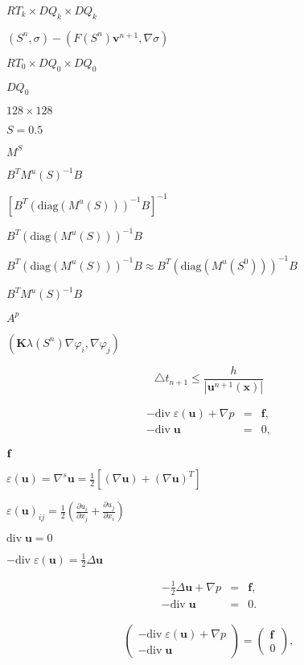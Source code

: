 \documentclass{article}
\begin{document}
$RT_k \times DQ_k \times DQ_k$
\pagebreak

$(S^n,\sigma)-(F(S^n) \mathbf{v}^{n+1},\nabla \sigma)$
\pagebreak

$RT_0\times DQ_0 \times DQ_0$
\pagebreak

$DQ_0$
\pagebreak

$128\times 128$
\pagebreak

$S=0.5$
\pagebreak

$M^S$
\pagebreak

$B^TM^u(S)^{-1}B$
\pagebreak

$[B^T (\textrm{diag}(M^u(S)))^{-1} B]^{-1}$
\pagebreak

$B^T (\textrm{diag}(M^u(S)))^{-1} B$
\pagebreak

$B^T (\textrm{diag}(M^u(S)))^{-1} B \approx B^T (\textrm{diag}(M^u(S^0)))^{-1} B$
\pagebreak

$B^T M^u(S)^{-1} B$
\pagebreak

$A^p$
\pagebreak

$(\mathbf{K}\lambda(S^n) \nabla \varphi_i,\nabla\varphi_j)$
\pagebreak

\[ \triangle t_{n+1} \le \frac h{|\mathbf{u}^{n+1}(\mathbf{x})|} \]
\pagebreak

\begin{eqnarray*} -\textrm{div}\; \varepsilon(\textbf{u}) + \nabla p &=& \textbf{f}, \\ -\textrm{div}\; \textbf{u} &=& 0, \end{eqnarray*}
\pagebreak

$\textbf f$
\pagebreak

$\varepsilon(\textbf{u})= \nabla^s{\textbf{u}}= \frac 12 \left[ (\nabla \textbf{u}) + (\nabla \textbf{u})^T\right]$
\pagebreak

$\varepsilon(\textbf{u})_{ij}=\frac 12\left(\frac{\partial u_i}{\partial x_j} + \frac{\partial u_j}{\partial x_i}\right)$
\pagebreak

$\textrm{div}\; \textbf{u}=0$
\pagebreak

$-\textrm{div}\; \varepsilon(\textbf{u}) = \frac 12 \Delta \textbf{u}$
\pagebreak

\begin{eqnarray*} -\frac 12 \Delta\textbf{u} + \nabla p &=& \textbf{f}, \\ -\textrm{div}\; \textbf{u} &=& 0. \end{eqnarray*}
\pagebreak

\begin{eqnarray*} \begin{pmatrix} {-\textrm{div}\; \varepsilon(\textbf{u}) + \nabla p} \\ {-\textrm{div}\; \textbf{u}} \end{pmatrix} = \begin{pmatrix} {\textbf{f}} \\ 0 \end{pmatrix}, \end{eqnarray*}
\pagebreak
\end{document}
